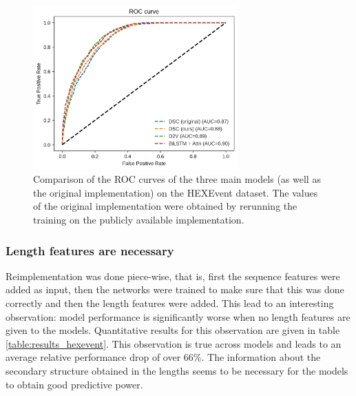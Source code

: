 \begin{figure}
	\centering\includegraphics[width=0.7\textwidth]{../visualizations/hexevent_cross_model_roc_auc_comparison.png} 
	\caption[bla.]{Comparison of the ROC curves of the three main models (as well as the original implementation) on the HEXEvent dataset. The values of the original implementation were obtained by rerunning the training on the publicly available implementation. }
	\label{fig:hexevent_auc}
\end{figure}






\subsubsection{Length features are necessary}
Reimplementation was done piece-wise, that is, first the sequence features were added as input, then the networks were trained to make sure that this was done correctly and then the length features were added. This lead to an interesting observation: model performance is significantly worse when no length features are given to the models. Quantitative results for this observation are given in table \ref{table:results_hexevent}. This observation is true across models and leads to an average relative performance drop of over 66\%. The information about the secondary structure obtained in the lengths seems to be necessary for the models to obtain good predictive power.

